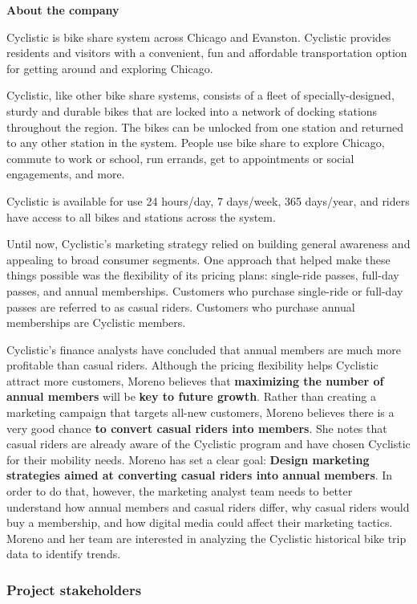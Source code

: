\documentclass[
]{article}
\begin{document}
\textbf{About the company}

Cyclistic is bike share system across Chicago and Evanston. Cyclistic
provides residents and visitors with a convenient, fun and affordable
transportation option for getting around and exploring Chicago.

Cyclistic, like other bike share systems, consists of a fleet of
specially-designed, sturdy and durable bikes that are locked into a
network of docking stations throughout the region. The bikes can be
unlocked from one station and returned to any other station in the
system. People use bike share to explore Chicago, commute to work or
school, run errands, get to appointments or social engagements, and
more.

Cyclistic is available for use 24 hours/day, 7 days/week, 365 days/year,
and riders have access to all bikes and stations across the system.

Until now, Cyclistic's marketing strategy relied on building general
awareness and appealing to broad consumer segments. One approach that
helped make these things possible was the flexibility of its pricing
plans: single-ride passes, full-day passes, and annual memberships.
Customers who purchase single-ride or full-day passes are referred to as
casual riders. Customers who purchase annual memberships are Cyclistic
members.

Cyclistic's finance analysts have concluded that annual members are much
more profitable than casual riders. Although the pricing flexibility
helps Cyclistic attract more customers, Moreno believes that
\textbf{maximizing the number of annual members} will be \textbf{key to
future growth}. Rather than creating a marketing campaign that targets
all-new customers, Moreno believes there is a very good chance
\textbf{to convert casual riders into members}. She notes that casual
riders are already aware of the Cyclistic program and have chosen
Cyclistic for their mobility needs. Moreno has set a clear goal:
\textbf{Design marketing strategies aimed at converting casual riders
into annual members}. In order to do that, however, the marketing
analyst team needs to better understand how annual members and casual
riders differ, why casual riders would buy a membership, and how digital
media could affect their marketing tactics. Moreno and her team are
interested in analyzing the Cyclistic historical bike trip data to
identify trends.

\hypertarget{project-stakeholders}{%
\subsubsection{Project stakeholders}\label{project-stakeholders}}
\end{document}
